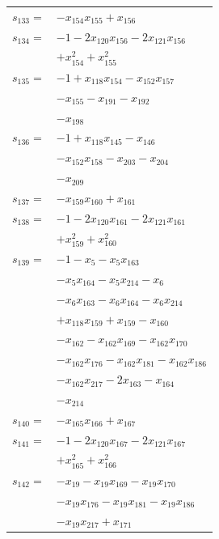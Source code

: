 \begin{longtable}{@{}r@{\;}l@{}}
\(s_{133}=\) & \(\displaystyle -x_{154}x_{155} +x_{156}\) \\[3pt]
\(s_{134}=\) & \(\displaystyle -1 -2x_{120}x_{156} -2x_{121}x_{156}\) \\
 & \(\displaystyle +x_{154}^{2} +x_{155}^{2}\) \\[3pt]
\(s_{135}=\) & \(\displaystyle -1 +x_{118}x_{154} -x_{152}x_{157}\) \\
 & \(\displaystyle -x_{155} -x_{191} -x_{192}\) \\
 & \(\displaystyle -x_{198}\) \\[3pt]
\(s_{136}=\) & \(\displaystyle -1 +x_{118}x_{145} -x_{146}\) \\
 & \(\displaystyle -x_{152}x_{158} -x_{203} -x_{204}\) \\
 & \(\displaystyle -x_{209}\) \\[3pt]
\(s_{137}=\) & \(\displaystyle -x_{159}x_{160} +x_{161}\) \\[3pt]
\(s_{138}=\) & \(\displaystyle -1 -2x_{120}x_{161} -2x_{121}x_{161}\) \\
 & \(\displaystyle +x_{159}^{2} +x_{160}^{2}\) \\[3pt]
\(s_{139}=\) & \(\displaystyle -1 -x_{5} -x_{5}x_{163}\) \\
 & \(\displaystyle -x_{5}x_{164} -x_{5}x_{214} -x_{6}\) \\
 & \(\displaystyle -x_{6}x_{163} -x_{6}x_{164} -x_{6}x_{214}\) \\
 & \(\displaystyle +x_{118}x_{159} +x_{159} -x_{160}\) \\
 & \(\displaystyle -x_{162} -x_{162}x_{169} -x_{162}x_{170}\) \\
 & \(\displaystyle -x_{162}x_{176} -x_{162}x_{181} -x_{162}x_{186}\) \\
 & \(\displaystyle -x_{162}x_{217} -2x_{163} -x_{164}\) \\
 & \(\displaystyle -x_{214}\) \\[3pt]
\(s_{140}=\) & \(\displaystyle -x_{165}x_{166} +x_{167}\) \\[3pt]
\(s_{141}=\) & \(\displaystyle -1 -2x_{120}x_{167} -2x_{121}x_{167}\) \\
 & \(\displaystyle +x_{165}^{2} +x_{166}^{2}\) \\[3pt]
\(s_{142}=\) & \(\displaystyle -x_{19} -x_{19}x_{169} -x_{19}x_{170}\) \\
 & \(\displaystyle -x_{19}x_{176} -x_{19}x_{181} -x_{19}x_{186}\) \\
 & \(\displaystyle -x_{19}x_{217} +x_{171}\) \\[3pt]

\end{longtable}
